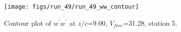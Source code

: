 \begin{figure}[H]
\centering
\texttt{[image: figs/run\_49/run\_49\_ww\_contour]}
\caption{Contour plot of $\overline{w^\prime w^\prime}$ at $z/c$=9.00, $V_{free}$=31.28, station 5.}
\end{figure}


